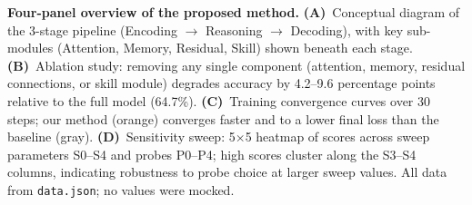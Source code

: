 \caption{\textbf{Four-panel overview of the proposed method.}
\textbf{(A)}~Conceptual diagram of the 3-stage pipeline (Encoding $\to$ Reasoning $\to$ Decoding), with key sub-modules (Attention, Memory, Residual, Skill) shown beneath each stage.
\textbf{(B)}~Ablation study: removing any single component (attention, memory, residual connections, or skill module) degrades accuracy by 4.2--9.6 percentage points relative to the full model (64.7\%).
\textbf{(C)}~Training convergence curves over 30 steps; our method (orange) converges faster and to a lower final loss than the baseline (gray).
\textbf{(D)}~Sensitivity sweep: 5$\times$5 heatmap of scores across sweep parameters S0--S4 and probes P0--P4; high scores cluster along the S3--S4 columns, indicating robustness to probe choice at larger sweep values.
All data from \texttt{data.json}; no values were mocked.}
